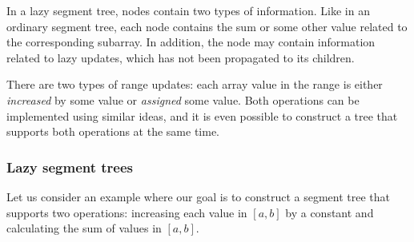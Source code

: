 In a lazy segment tree, nodes contain two types of
information.
Like in an ordinary segment tree,
each node contains the sum or some other value
related to the corresponding subarray.
In addition, the node may contain information
related to lazy updates, which has not been
propagated to its children.

There are two types of range updates:
each array value in the range is either
\emph{increased} by some value
or \emph{assigned} some value.
Both operations can be implemented using
similar ideas, and it is even possible to construct
a tree that supports both operations at the same time.

\subsubsection{Lazy segment trees}

Let us consider an example where our goal is to
construct a segment tree that supports
two operations: increasing each value in
$[a,b]$ by a constant and calculating the sum of
values in $[a,b]$.

